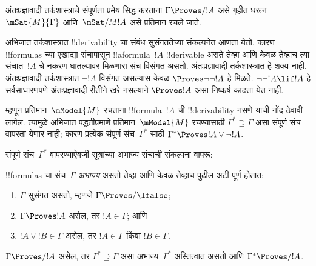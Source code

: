 \documentclass[../../../include/open-logic-section]{subfiles}
\begin{document}


अंतःप्रज्ञावादी तर्कशास्त्राचे संपूर्णता प्रमेय सिद्ध करताना
$\Gamma \Proves/ !A$ असे गृहीत धरून
$\mSat{M}{\Gamma}$ आणि~$\mSat/{M}{!A}$
असे प्रतिमान रचले जाते.

अभिजात तर्कशास्त्रात !!{derivability} चा संबंध
सुसंगततेच्या संकल्पनेत आणता येतो. कारण !!{formula}s च्या
एखाद्या संचापासून !!a{formula}~$!A$
!!{derivable} असते तेव्हा आणि केवळ तेव्हाच
त्या संचात~$!A$ चे नकरण घातल्यावर मिळणारा
संच विसंगत असतो. अंतःप्रज्ञावादी तर्कशास्त्रात
हे शक्य नाही. अंतःप्रज्ञावादी तर्कशास्त्रात
$\lnot!A$ विसंगत असल्यास केवळ
$\Proves \lnot\lnot !A$ हे मिळते.
$\lnot\lnot!A \lif !A$ हे सर्वसाधारणपणे
अंतःप्रज्ञावादी रीतीने खरे नसल्याने
$\Proves !A$ असा निष्कर्ष काढता येत नाही.

म्हणून प्रतिमान~$\mModel{M}$ रचताना
!!{formula}~$!A$ ची !!{derivability} नसणे
याची नोंद ठेवावी लागेल. त्यामुळे अभिजात
पद्धतीप्रमाणे प्रतिमान~$\mModel{M}$
रचण्यासाठी $\Gamma^* \supseteq \Gamma$
असा संपूर्ण संच वापरता येणार नाही;
कारण प्रत्येक संपूर्ण संच~$\Gamma^*$ साठी
$\Gamma^* \Proves !A \lor \lnot !A$.

संपूर्ण संच~$\Gamma^*$ वापरण्याऐवजी
सूत्रांच्या अभाज्य संचाची संकल्पना वापरू:

\begin{defn}
  !!{formula}s चा संच~$\Gamma$
  \emph{अभाज्य} असतो तेव्हा आणि केवळ तेव्हाच
  पुढील अटी पूर्ण होतात:
  \begin{enumerate}
  \item{} $\Gamma$ सुसंगत असतो,
    म्हणजे $\Gamma \Proves/ \lfalse$;
  \item{} $\Gamma \Proves !A$
    असेल, तर $!A \in \Gamma$; आणि
  \item{} $!A \lor !B \in \Gamma$
    असेल, तर $!A \in \Gamma$ किंवा
    $!B \in \Gamma$.
  \end{enumerate}
\end{defn}

\begin{lem}[लिंडेनबाउमचे पूर्वप्रमेय]
  $\Gamma \Proves/ !A$ असेल, तर
  $\Gamma^* \supseteq \Gamma$ असा
  अभाज्य~$\Gamma^*$ अस्तित्वात असतो
  आणि $\Gamma^* \Proves/ !A$.
\end{lem}
\end{document}
